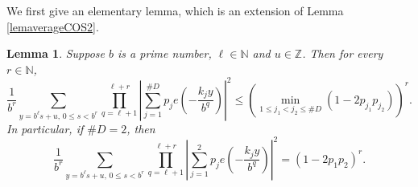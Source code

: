 \documentclass[amssymb,amsfonts,refcheck,12pt,verbatim,righttag]{amsart}
\numberwithin{equation}{section} %
\newtheorem{lem}[thm]{Lemma}
\theoremstyle{plain}
\begin{document}
We first give an elementary lemma, which is an extension of Lemma \ref{lemaverageCOS2}.
\begin{lem}\label{Keyel}
	Suppose $b$ is a prime number, $\ell\in\mathbb{N}$ and $u\in\mathbb{Z}$. Then for every $r\in\mathbb{N}$,
	\begin{equation}\label{I1}
		\frac{1}{b^{r}}\sum_{y=b^{\ell}s+u,\, 0\leq s<b^{r}}\prod_{q=\ell+1}^{\ell+r}\left|\sum_{j=1}^{\#D}p_{j}e\left(-\frac{k_{j}y}{b^{q}}\right)\right|^{2}\leq\left(\min_{1\leq j_{1}<j_{2}\leq\#D}(1-2p_{j_{1}}p_{j_{2}})\right)^{r}.
	\end{equation}
	In particular, if $\#D=2$, then
\begin{equation}\label{E1}
		\frac{1}{b^{r}}\sum_{y=b^{\ell}s+u,\, 0\leq s<b^{r}}\prod_{q=\ell+1}^{\ell+r}\left|\sum_{j=1}^{2}p_{j}e\left(-\frac{k_{j}y}{b^{q}}\right)\right|^{2}=(1-2p_{1}p_{2})^{r}.
	\end{equation}
\end{lem}
\end{document}
